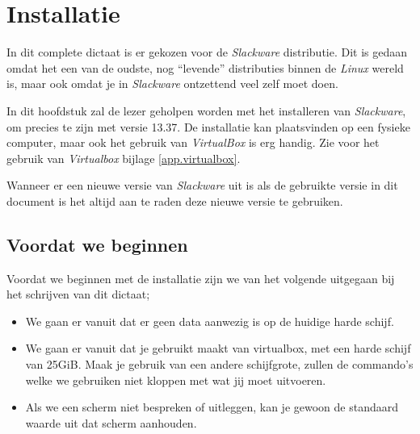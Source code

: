 %
%
%
%

\chapter{Installatie}\label{h.inst}
In dit complete dictaat is er gekozen voor de \emph{Slackware} distributie. Dit is gedaan omdat het een van de oudste, nog ``levende'' distributies binnen de \emph{Linux} wereld is, maar ook omdat je in \emph{Slackware} ontzettend veel zelf moet doen.

In dit hoofdstuk zal de lezer geholpen worden met het installeren van \emph{Slackware}, om precies te zijn met versie 13.37. De installatie kan plaatsvinden op een fysieke computer, maar ook het gebruik van \emph{VirtualBox} is erg handig. Zie voor het gebruik van \emph{Virtualbox} bijlage \ref{app.virtualbox}. 

Wanneer er een nieuwe versie van \emph{Slackware} uit is als de gebruikte versie in dit document is het altijd aan te raden deze nieuwe versie te gebruiken.

\section{Voordat we beginnen}
Voordat we beginnen met de installatie zijn we van het volgende uitgegaan bij het schrijven van dit dictaat;
\begin{itemize}
  \item We gaan er vanuit dat er geen data aanwezig is op de huidige harde schijf.
  \item We gaan er vanuit dat je gebruikt maakt van virtualbox, met een harde schijf van 25GiB. Maak je gebruik van een andere schijfgrote, zullen de commando's welke we gebruiken niet kloppen met wat jij moet uitvoeren.
  \item Als we een scherm niet bespreken of uitleggen, kan je gewoon de standaard waarde uit dat scherm aanhouden.
\end{itemize}

